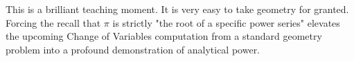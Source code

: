 \begin{didactic_insight}
This is a brilliant teaching moment. It is very easy to take geometry for granted. Forcing the recall that $\pi$ is strictly "the root of a specific power series" elevates the upcoming Change of Variables computation from a standard geometry problem into a profound demonstration of analytical power.
\end{didactic_insight}
